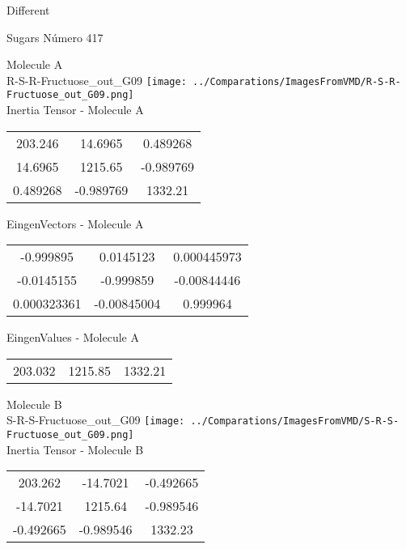 \begin{center}
\vtab
\vtab
\textcolor{NavyBlue}{\Large Different}
\end{center}

 \newpage

\vtab[-2cm]
\begin{center}
{\large Sugars \tab Número 417}
\end{center}
\begin{multicols}{2}
\begin{center}

Molecule A \\ 
R-S-R-Fructuose\_out\_G09
\texttt{[image: ../Comparations/ImagesFromVMD/R-S-R-Fructuose\_out\_G09.png]}
\\
Inertia Tensor - Molecule A \\
\vtab

\begin{tabular}{|c c c|}
203.246	 & 	14.6965	 & 	0.489268	 \\
14.6965	 & 	1215.65	 & 	-0.989769	 \\
0.489268	 & 	-0.989769	 & 	1332.21
\end{tabular}

\vtab
 EingenVectors - Molecule A     \\
\vtab
\begin{tabular}{|c c c|}
-0.999895	 & 	0.0145123	 & 	0.000445973	 \\
-0.0145155	 & 	-0.999859	 & 	-0.00844446	 \\
0.000323361	 & 	-0.00845004	 & 	0.999964
\end{tabular}

\vtab
 EingenValues - Molecule A     \\
\vtab
\begin{tabular}{|c c c|}
203.032	 & 	1215.85	 & 	1332.21	 \\
\end{tabular}
\columnbreak

Molecule B \\ 
S-R-S-Fructuose\_out\_G09
\texttt{[image: ../Comparations/ImagesFromVMD/S-R-S-Fructuose\_out\_G09.png]}
\\
Inertia Tensor - Molecule B \\
\vtab

\begin{tabular}{|c c c|}
203.262	 & 	-14.7021	 & 	-0.492665	 \\
-14.7021	 & 	1215.64	 & 	-0.989546	 \\
-0.492665	 & 	-0.989546	 & 	1332.23
\end{tabular}


\end{center}
\end{multicols}
